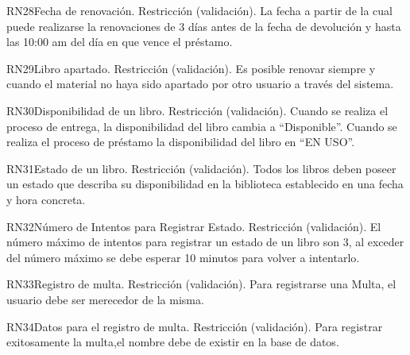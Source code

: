 \begin{BussinesRule}{RN28}{Fecha de renovación.} 
	\BRitem[Tipo:] Restricción (validación).
	\BRitem[Descripción:]La fecha a partir de la cual puede realizarse la renovaciones de 3 días antes de la fecha de devolución y hasta las 10:00 am del día en que vence el préstamo.
\end{BussinesRule}

\begin{BussinesRule}{RN29}{Libro apartado.} 
	\BRitem[Tipo:] Restricción (validación).
	\BRitem[Descripción:]Es posible renovar siempre y cuando el material no haya sido apartado por otro usuario a través del sistema.
\end{BussinesRule}

\begin{BussinesRule}{RN30}{Disponibilidad de un libro.} 
	\BRitem[Tipo:] Restricción (validación).
	\BRitem[Descripción:]Cuando se realiza el proceso de entrega, la disponibilidad del libro cambia a “Disponible”. Cuando se realiza el proceso de préstamo la disponibilidad del libro en “EN USO”.
\end{BussinesRule}

\begin{BussinesRule}{RN31}{Estado de un libro.} 
	\BRitem[Tipo:] Restricción (validación).
	\BRitem[Descripción:]Todos los libros deben poseer un estado que describa su disponibilidad en la biblioteca establecido en una fecha y hora concreta.
\end{BussinesRule}

\begin{BussinesRule}{RN32}{Número de Intentos para Registrar Estado.} 
	\BRitem[Tipo:] Restricción (validación).
	\BRitem[Descripción:]El número máximo de intentos para registrar un estado de un libro  son 3, al exceder del número máximo se debe esperar 10  minutos para volver a intentarlo.
\end{BussinesRule}

\begin{BussinesRule}{RN33}{Registro de multa.} 
	\BRitem[Tipo:] Restricción (validación).
	\BRitem[Descripción:]Para registrarse una Multa, el usuario debe ser merecedor de la misma.
\end{BussinesRule}

\begin{BussinesRule}{RN34}{Datos para el registro de multa.} 
	\BRitem[Tipo:] Restricción (validación).
	\BRitem[Descripción:]Para registrar exitosamente la multa,el nombre debe de existir en la base de datos.
\end{BussinesRule}

